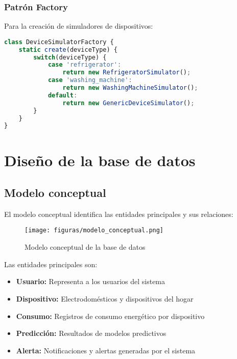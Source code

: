 \subsubsection{Patrón Factory}

Para la creación de simuladores de dispositivos:

\begin{lstlisting}[language=JavaScript, caption=Factory para simuladores de dispositivos]
class DeviceSimulatorFactory {
    static create(deviceType) {
        switch(deviceType) {
            case 'refrigerator':
                return new RefrigeratorSimulator();
            case 'washing_machine':
                return new WashingMachineSimulator();
            default:
                return new GenericDeviceSimulator();
        }
    }
}
\end{lstlisting}

\section{Diseño de la base de datos}

\subsection{Modelo conceptual}

El modelo conceptual identifica las entidades principales y sus relaciones:

\begin{figure}[H]
    \centering
    \texttt{[image: figuras/modelo\_conceptual.png]}
    \caption{Modelo conceptual de la base de datos}
    \label{fig:modelo_conceptual}
\end{figure}

Las entidades principales son:

\begin{itemize}
    \item \textbf{Usuario:} Representa a los usuarios del sistema
    \item \textbf{Dispositivo:} Electrodomésticos y dispositivos del hogar
    \item \textbf{Consumo:} Registros de consumo energético por dispositivo
    \item \textbf{Predicción:} Resultados de modelos predictivos
    \item \textbf{Alerta:} Notificaciones y alertas generadas por el sistema
\end{itemize}

